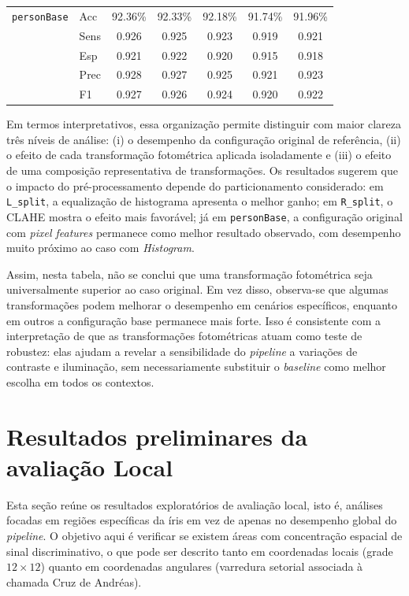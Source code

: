 \documentclass[12pt,a4paper]{article}
\begin{document}
\begin{table}[htbp]
\begin{tabular}{llccccc}
\texttt{personBase} & Acc  & 92.36\% & 92.33\% & 92.18\% & 91.74\% & 91.96\% \\
                    & Sens & 0.926   & 0.925   & 0.923   & 0.919   & 0.921 \\
                    & Esp  & 0.921   & 0.922   & 0.920   & 0.915   & 0.918 \\
                    & Prec & 0.928   & 0.927   & 0.925   & 0.921   & 0.923 \\
                    & F1   & 0.927   & 0.926   & 0.924   & 0.920   & 0.922 \\
\bottomrule
\end{tabular}
\end{table}

Em termos interpretativos, essa organização permite distinguir com maior clareza três níveis de análise: (i) o desempenho da configuração original de referência, (ii) o efeito de cada transformação fotométrica aplicada isoladamente e (iii) o efeito de uma composição representativa de transformações. Os resultados sugerem que o impacto do pré-processamento depende do particionamento considerado: em \texttt{L\_split}, a equalização de histograma apresenta o melhor ganho; em \texttt{R\_split}, o CLAHE mostra o efeito mais favorável; já em \texttt{personBase}, a configuração original com \textit{pixel features} permanece como melhor resultado observado, com desempenho muito próximo ao caso com \textit{Histogram}.

Assim, nesta tabela, não se conclui que uma transformação fotométrica seja universalmente superior ao caso original. Em vez disso, observa-se que algumas transformações podem melhorar o desempenho em cenários específicos, enquanto em outros a configuração base permanece mais forte. Isso é consistente com a interpretação de que as transformações fotométricas atuam como teste de robustez: elas ajudam a revelar a sensibilidade do \textit{pipeline} a variações de contraste e iluminação, sem necessariamente substituir o \textit{baseline} como melhor escolha em todos os contextos.

\section{Resultados preliminares da avaliação Local}
Esta seção reúne os resultados exploratórios de avaliação local, isto é, análises focadas em regiões específicas da íris em vez de apenas no desempenho global do \textit{pipeline}. O objetivo aqui é verificar se existem áreas com concentração espacial de sinal discriminativo, o que pode ser descrito tanto em coordenadas locais (grade \(12\times 12\)) quanto em coordenadas angulares (varredura setorial associada à chamada Cruz de Andréas).
\end{document}
